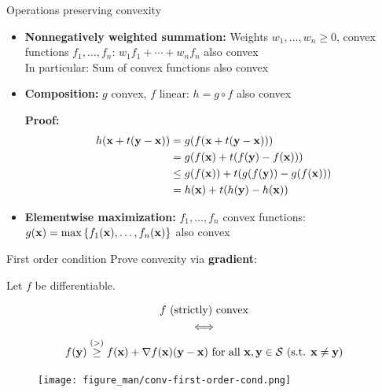 \documentclass[11pt,compress,t,notes=noshow, xcolor=table]{beamer}
\begin{document}
\begin{vbframe}{Operations preserving convexity}

\begin{itemize}
    \item \textbf{Nonnegatively weighted summation:} Weights $w_1,\ldots,w_n\geq0$, convex functions $f_1,\ldots,f_n$:
        $w_1f_1 + \cdots + w_nf_n$ also convex \\
        In particular: Sum of convex functions also convex
    \item \textbf{Composition:} $g$ convex, $f$ linear: $h = g \circ f$ also convex

        \begin{footnotesize}
            \textbf{Proof:}
            \begin{align*}
                h(\mathbf{x} + t(\mathbf{y}-\mathbf{x})) &= g(f(\mathbf{x} + t(\mathbf{y}-\mathbf{x}))) \\
                &= g(f(\mathbf{x}) + t(f(\mathbf{y}) - f(\mathbf{x}))) \\
                &\leq g(f(\mathbf{x})) + t(g(f(\mathbf{y})) - g(f(\mathbf{x}))) \\
                &= h(\mathbf{x}) + t(h(\mathbf{y}) - h(\mathbf{x}))
            \end{align*}
        \end{footnotesize}
    \item \textbf{Elementwise maximization:} $f_1,\ldots,f_n$ convex functions: $g(\mathbf{x}) = \max\left\lbrace f_1(\mathbf{x}),\ldots,f_n(\mathbf{x}) \right\rbrace$ also convex
\end{itemize}

\end{vbframe}


\begin{vbframe}{First order condition}
Prove convexity via \textbf{gradient}:

\vspace{-0.5\baselineskip}


    Let $f$ be differentiable.

    \vspace{-\baselineskip}

    \begin{gather*}
        \textnormal{$f$ (strictly) convex} \\
        \Longleftrightarrow \\
        f(\mathbf{y}) \overset{(>)}{\geq} f(\mathbf{x}) + \nabla f(\mathbf{x}) (\mathbf{y}-\mathbf{x}) \textnormal{ for all $\mathbf{x},\mathbf{y}\in\mathcal{S}$ (s.t. $\mathbf{x} \not= \mathbf{y}$)}
    \end{gather*}


\vspace{-0.2cm}

\begin{figure}
    \centering
    \texttt{[image: figure\_man/conv-first-order-cond.png]}
\end{figure}

\end{vbframe}
\end{document}
